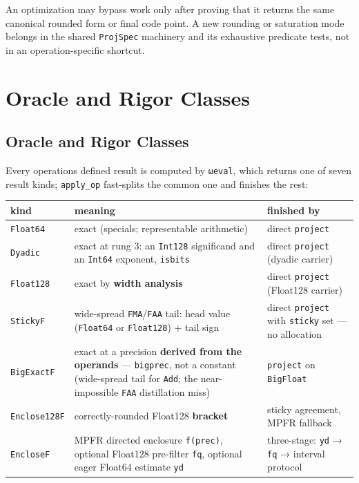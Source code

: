 An optimization may bypass work only after proving that it returns the same canonical rounded form or final code point. A new rounding or saturation mode belongs in the shared \texttt{ProjSpec} machinery and its exhaustive predicate tests, not in an operation-specific shortcut.



\chapter{Oracle and Rigor Classes}


\section{Oracle and Rigor Classes}



\label{15955361272821748266}{}


Every operation{\textquotesingle}s defined result is computed by \texttt{ωeval}, which returns one of seven result kinds; \texttt{apply\_\allowbreak{}op} fast-splits the common one and finishes the rest:




\begin{table}[h]
\centering
\begin{tabulary}{\linewidth}{L L L}
\toprule
kind & meaning & finished by \\
\toprule
\texttt{Float64} & exact (specials; representable arithmetic) & direct \texttt{project} \\
\texttt{Dyadic} & exact at rung 3: an \texttt{Int128} significand and an \texttt{Int64} exponent, \texttt{isbits} & direct \texttt{project} (dyadic carrier) \\
\texttt{Float128} & exact by \textbf{width analysis} & direct \texttt{project} (Float128 carrier) \\
\texttt{StickyF} & wide-spread \texttt{FMA}/\allowbreak\texttt{FAA} tail: head value (\texttt{Float64} or \texttt{Float128}) + tail sign & direct \texttt{project} with \texttt{sticky} set — no allocation \\
\texttt{BigExactF} & exact at a precision \textbf{derived from the operands} — \texttt{bigprec}, not a constant (wide-spread tail for \texttt{Add}; the near-impossible \texttt{FAA} distillation miss) & \texttt{project} on \texttt{BigFloat} \\
\texttt{Enclose128F} & correctly-rounded Float128 \textbf{bracket} & sticky agreement, MPFR fallback \\
\texttt{EncloseF} & MPFR directed enclosure \texttt{f(prec)}, optional Float128 pre-filter \texttt{fq}, optional eager Float64 estimate \texttt{yd} & three-stage: \texttt{yd} → \texttt{fq} → interval protocol \\
\bottomrule
\end{tabulary}

\end{table}



